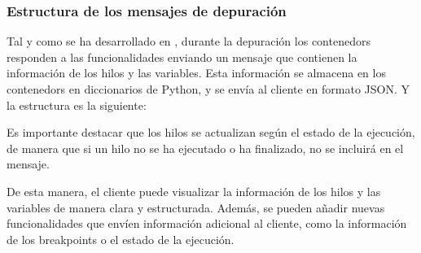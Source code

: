 \FloatBarrier

\subsubsection{Estructura de los mensajes de depuración} \label{subsec:estructura-mensajes-depuracion}
Tal y como se ha desarrollado en , durante la depuración los \glspl{contenedor} responden a las funcionalidades enviando un mensaje que contienen la información de los \glspl{hilo} y las variables. Esta información se almacena en los \glspl{contenedor} en diccionarios de Python, y se envía al cliente en formato \gls{JSON}. Y la estructura es la siguiente:

\begin{figure}[htb]
    {
    \begin{tcolorbox}
    \end{tcolorbox}
    }
\end{figure}

Es importante destacar que los \glspl{hilo} se actualizan según el estado de la ejecución, de manera que si un \gls{hilo} no se ha ejecutado o ha finalizado, no se incluirá en el mensaje.

De esta manera, el cliente puede visualizar la información de los \glspl{hilo} y las variables de manera clara y estructurada. Además, se pueden añadir nuevas funcionalidades que envíen información adicional al cliente, como la información de los \glspl{breakpoint} o el estado de la ejecución.
